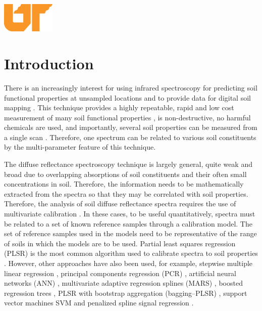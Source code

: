 \documentclass[12pt,letterpaper]{article}
\begin{document}
\begin{titlepage}
\includegraphics[width=1in]{logo.png}\\[1cm] %
 

\vfill %

\end{titlepage}


\section{Introduction}
There is an increasingly interest for using infrared spectroscopy for predicting soil functional properties at unsampled locations and to provide data for digital soil mapping \cite{kuang20124}. This technique provides a highly repeatable, rapid and low cost measurement of many soil functional properties \cite{viscarra2009improved}, is non-destructive, no harmful chemicals are used, and importantly, several soil properties can be measured from a single scan \cite{viscarra2006visible}. Therefore, one spectrum can be related to various soil constituents by the multi-parameter feature of this technique.

The diffuse reflectance spectroscopy technique is largely general, quite weak and broad due to overlapping absorptions of soil constituents and their often small concentrations in soil. Therefore, the information needs to be mathematically extracted from the spectra so that they may be correlated with soil properties. Therefore, the analysis of soil diffuse reflectance spectra requires the use of multivariate calibration \cite{martens1989multivariate}. In these cases, to be useful quantitatively, spectra must be related to a set of known reference samples through a calibration model. The set of reference samples used in the models need to be representative of the range of soils in which the models are to be used. Partial least squares regression (PLSR) is the most common algorithm used to calibrate spectra to soil properties \cite{wold1983multivariate}. However, other approaches have also been used, for example, stepwise multiple linear regression \cite{dalal1986simultaneous}, principal components regression (PCR) \cite{chang2001near}, artificial neural networks (ANN) \cite{daniel2003artificial}, multivariate adaptive regression splines (MARS) \cite{shepherd2002development}, boosted regression trees \cite{brown2006global}, PLSR with bootstrap aggregation (bagging--PLSR) \cite{viscarra2007robust}, support vector machines SVM and penalized spline signal regression \cite{stevens2008laboratory}.
\end{document}
